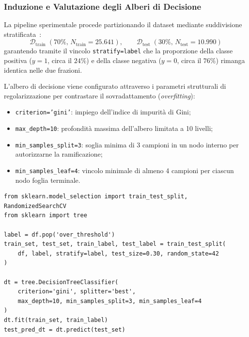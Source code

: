 \FloatBarrier
\subsubsection{Induzione e Valutazione degli Alberi di Decisione}
\label{subsec:dm-lab-dt}

La pipeline sperimentale procede partizionando il dataset mediante suddivisione stratificata~\cite{mannocci2026imbalanced}:
\begin{equation}
    \mathcal{D}_{\text{train}} \; (70\%, \, N_{\text{train}} = 25.641), \qquad \mathcal{D}_{\text{test}} \; (30\%, \, N_{\text{test}} = 10.990)
\end{equation}
garantendo tramite il vincolo \texttt{stratify=label} che la proporzione della classe positiva ($y=1$, circa il $24\%$) e della classe negativa ($y=0$, circa il $76\%$) rimanga identica nelle due frazioni.

L'albero di decisione viene configurato attraverso i parametri strutturali di regolarizzazione per contrastare il sovradattamento (\textit{overfitting}):
\begin{itemize}
    \item \texttt{criterion='gini'}: impiego dell'indice di impurità di Gini;
    \item \texttt{max\_depth=10}: profondità massima dell'albero limitata a 10 livelli;
    \item \texttt{min\_samples\_split=3}: soglia minima di 3 campioni in un nodo interno per autorizzarne la ramificazione;
    \item \texttt{min\_samples\_leaf=4}: vincolo minimale di almeno 4 campioni per ciascun nodo foglia terminale.
\end{itemize}

\begin{lstlisting}[style=pythoncode, caption={Partizionamento stratificato, addestramento dell'albero di decisione e ricerca casuale degli iperparametri.}]
from sklearn.model_selection import train_test_split, RandomizedSearchCV
from sklearn import tree

label = df.pop('over_threshold')
train_set, test_set, train_label, test_label = train_test_split(
    df, label, stratify=label, test_size=0.30, random_state=42
)

dt = tree.DecisionTreeClassifier(
    criterion='gini', splitter='best',
    max_depth=10, min_samples_split=3, min_samples_leaf=4
)
dt.fit(train_set, train_label)
test_pred_dt = dt.predict(test_set)
\end{lstlisting}

